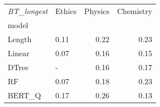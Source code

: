 \begin{tabular}{llrr}
\toprule
\textit{BT\_longest} & Ethics &  Physics &  Chemistry \\
model  &        &          &            \\
\midrule
Length &   0.11 &     0.22 &       0.23 \\
Linear &   0.07 &     0.16 &       0.15 \\
DTree  &      - &     0.16 &       0.17 \\
RF     &   0.07 &     0.18 &       0.23 \\
BERT\_Q &   0.17 &     0.26 &       0.13 \\
\bottomrule
\end{tabular}
